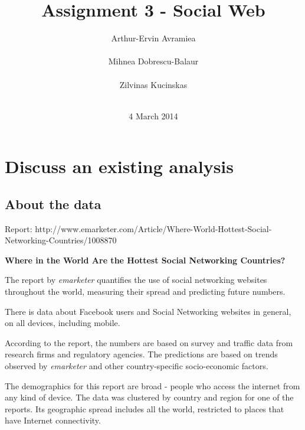 \documentclass{acm_proc_10ptArticle-sp}
\begin{document}
\title{Assignment 3 - Social Web}

\author{
%
\alignauthor Arthur-Ervin Avramiea\\
       \\
\alignauthor Mihnea Dobrescu-Balaur\\
	\\
\alignauthor Zilvinas Kucinskas\\
	\\
}

\date{4 March 2014}
\maketitle

\section{Discuss an existing analysis}

\subsection{About the data} 
Report: http://www.emarketer.com/Article/Where-World-Hottest-Social-Networking-Countries/1008870

\textbf{Where in the World Are the Hottest Social Networking Countries?}

The report by \textit{emarketer} quantifies the use of social networking websites throughout the world, measuring their spread and predicting future numbers. 

There is data about Facebook users and Social Networking websites in general, on all devices, including mobile.

According to the report, the numbers are based on survey and traffic data from research firms and regulatory agencies. The predictions are based on trends observed by \textit{emarketer} and other country-specific socio-economic factors.

The demographics for this report are broad - people who access the internet from any kind of device. The data was clustered by country and region for one of the reports. Its geographic spread includes all the world, restricted to places that have Internet connectivity.
\end{document}
